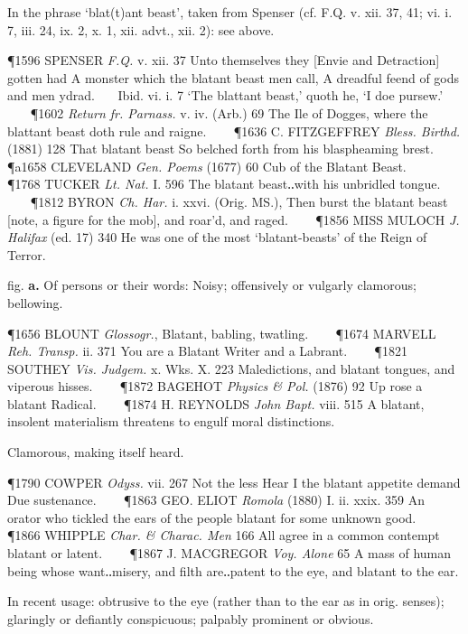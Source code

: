 \begin{description}[wide, labelwidth=!, labelindent=0pt]
\begin{myenumerate}

 In the phrase ‘blat(t)ant beast’, taken from Spenser (cf. F.Q. v. xii. 37, 41; vi. i. 7, iii. 24, ix. 2, x. 1, xii. advt., xii. 2): see above.

\P 1596 SPENSER  \textit{F.Q.} v. xii. 37 Unto themselves they [Envie and Detraction] gotten had A monster which the blatant beast men call, A dreadful feend of gods and men ydrad.    Ibid. vi. i. 7 ‘The blattant beast,’ quoth he, ‘I doe pursew.’    
\P 1602 \textit{Return fr. Parnass.} v. iv. (Arb.) 69 The Ile of Dogges, where the blattant beast doth rule and raigne.    
\P 1636 C. FITZGEFFREY  \textit{Bless. Birthd.} (1881) 128 That blatant beast So belched forth from his blaspheaming brest.
\P a1658 CLEVELAND  \textit{Gen. Poems} (1677) 60 Cub of the Blatant Beast.    
\P 1768 TUCKER  \textit{Lt. Nat.} I. 596 The blatant beast‥with his unbridled tongue.    
\P 1812 BYRON  \textit{Ch. Har.} i. xxvi. (Orig. MS.), Then burst the blatant beast [note, a figure for the mob], and roar'd, and raged.    
\P 1856 MISS MULOCH  \textit{J. Halifax} (ed. 17) 340 He was one of the most ‘blatant-beasts’ of the Reign of Terror.

 fig. \textbf{a.} Of persons or their words: Noisy; offensively or vulgarly clamorous; bellowing.

\P 1656 BLOUNT  \textit{Glossogr.}, Blatant, babling, twatling.    
\P 1674 MARVELL  \textit{Reh. Transp.} ii. 371 You are a Blatant Writer and a Labrant.    
\P 1821 SOUTHEY  \textit{Vis. Judgem.} x. Wks. X. 223 Maledictions, and blatant tongues, and viperous hisses.    
\P 1872 BAGEHOT  \textit{Physics \& Pol.} (1876) 92 Up rose a blatant Radical.    
\P 1874 H. REYNOLDS  \textit{John Bapt.} viii. 515 A blatant, insolent materialism threatens to engulf moral distinctions.

 Clamorous, making itself heard.

\P 1790 COWPER  \textit{Odyss.} vii. 267 Not the less Hear I the blatant appetite demand Due sustenance.    
\P 1863 GEO. ELIOT  \textit{Romola} (1880) I. ii. xxix. 359 An orator who tickled the ears of the people blatant for some unknown good.    
\P 1866 WHIPPLE  \textit{Char. \& Charac. Men} 166 All agree in a common contempt blatant or latent.    
\P 1867 J. MACGREGOR  \textit{Voy. Alone} 65 A mass of human being whose want‥misery, and filth are‥patent to the eye, and blatant to the ear.

 In recent usage: obtrusive to the eye (rather than to the ear as in orig. senses); glaringly or defiantly conspicuous; palpably prominent or obvious.


\end{myenumerate}
\end{description}
